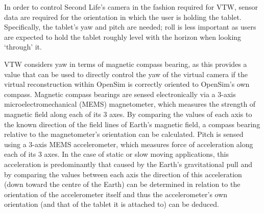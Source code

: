 \newcommand{\HMCvccFootnote}{\footnote{The HMC6343 requires 2.7 to 3.6V input on VCC/VDD, this table showing connection to 5V assumes a HMC6343 breakout with appropriate step down.}}

\newcommand{\itwocFootnote}{\footnote{The HMC6343's I2C lines must be pulled up to 3.3V, this table shows connection to an Arduino Uno R3's I2C lines which are pulled up to 5V assuming a HMC6343 breakout with appropriate level shifters.}}



In order to control Second Life's camera in the fashion required for VTW, sensor data are required for the orientation in which the user is holding the tablet. Specifically, the tablet's yaw and pitch are needed; roll is less important as users are expected to hold the tablet roughly level with the horizon when looking `through' it.

VTW considers yaw in terms of magnetic compass bearing, as this provides a value that can be used to directly control the yaw of the virtual camera if the virtual reconstruction within OpenSim is correctly oriented to OpenSim's own compass. Magnetic compass bearings are sensed electronically via a 3-axis microelectromechanical (MEMS) magnetometer, which measures the strength of magnetic field along each of its 3 axes. By comparing the values of each axis to the known direction of the field lines of Earth's magnetic field, a compass bearing relative to the magnetometer's orientation can be calculated. Pitch is sensed using a 3-axis MEMS accelerometer, which measures force of acceleration along each of its 3 axes. In the case of static or slow moving applications, this acceleration is predominantly that caused by the Earth's gravitational pull and by comparing the values between each axis the direction of this acceleration (down toward the centre of the Earth) can be determined in relation to the orientation of the accelerometer itself and thus the accelerometer's own orientation (and that of the tablet it is attached to) can be deduced.

